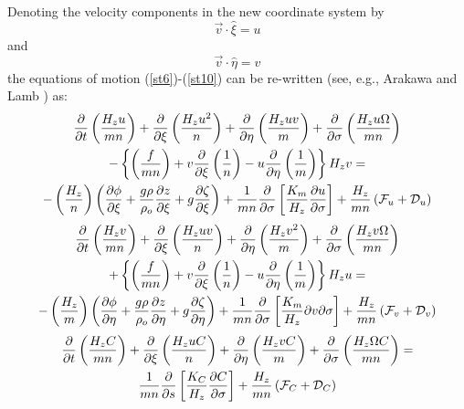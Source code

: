 Denoting the velocity components in the new coordinate system by
\begin{equation}
   \vec{v} \cdot \hat{\xi} = u
\end{equation}
and
\begin{equation}
   \vec{v} \cdot \hat{\eta} = v
\end{equation}
the equations of motion (\ref{st6})-(\ref{st10}) can be re-written
(see, e.g., Arakawa and Lamb \cite{AL}) as:
{\samepage
\begin{multline}
   \frac{\partial}{\partial t} \left( \frac{H_z u}{mn} \right) + \frac
   {\partial}{\partial \xi} \left( \frac{H_z u^2}{n} \right ) + \frac
   {\partial}{\partial \eta} \left( \frac{H_z uv}{m} \right) + \frac
   {\partial}{\partial \sigma} \left( \frac{H_z u\Omega}{mn} \right)
\\
   - \left\{\left(\frac{f}{mn} \right) + v \frac{\partial}{\partial \xi}
   \left( \frac{1}{n} \right) - u \frac{\partial}{\partial \eta} \left(
   \frac{1}{m} \right) \right\} H_z v =
\\
   -\left( \frac{H_z }{n} \right )
   \left( \frac{\partial \phi}{\partial \xi} +
   \frac{g \rho}{\rho_o} \frac{\partial z}{\partial \xi} +
   g \frac{\partial \zeta}{\partial \xi} \right) +
   \frac{ 1}{mn} \frac{\partial}{\partial \sigma}
   \left[ \frac{K_m}{H_z} \frac{\partial u}{\partial \sigma} \right] +
   \frac{ H_z}{mn}
   \left( {\cal F}_u + {\cal D}_u \right)
\label{st13}
\end{multline}
}
{\samepage
\begin{multline}
   \frac{\partial}{\partial t} \left( \frac{H_z v}{mn} \right) + \frac
   {\partial}{\partial \xi} \left( \frac{H_z uv}{n} \right ) + \frac
   {\partial}{\partial \eta} \left( \frac{H_z v^2}{m} \right) + \frac
   {\partial}{\partial \sigma} \left( \frac{H_z v\Omega}{mn} \right)
\\
   + \left\{\left(\frac{f}{mn} \right) + v \frac{\partial}{\partial \xi}
   \left( \frac{1}{n} \right) - u \frac{\partial}{\partial \eta} \left(
   \frac{1}{m} \right) \right\} H_z u =
\\
   -\left( \frac{H_z }{m} \right )
   \left( \frac{\partial \phi}{\partial \eta} +
   \frac{g \rho}{\rho_o} \frac{\partial z}{\partial \eta} +
   g \frac{\partial \zeta}{\partial \eta} \right) +
   \frac{ 1}{mn} \frac{\partial}{\partial \sigma}
   \left[ \frac{K_m}{H_z} {\partial v}{\partial \sigma} \right] +
   \frac{ H_z}{mn}
   \left( {\cal F}_v + {\cal D}_v \right)
\label{st14}
\end{multline}
}
\begin{multline}
   \frac{\partial}{\partial t} \left( \frac{H_z C}{mn} \right) +
   \frac {\partial}{\partial \xi} \left( \frac{H_z uC}{n} \right ) +
   \frac {\partial}{\partial \eta} \left( \frac{H_z vC}{m} \right) +
   \frac {\partial}{\partial \sigma}
   \left( \frac{H_z \Omega C}{mn} \right) =
\\
   \frac{ 1}{mn} \frac{\partial}{\partial s}
   \left[ \frac{K_C}{H_z} \frac{\partial C}{\partial \sigma} \right] +
   \frac{ H_z}{mn}
   \left( {\cal F}_{C} + {\cal D}_{C} \right)
\label{st15}
\end{multline}
